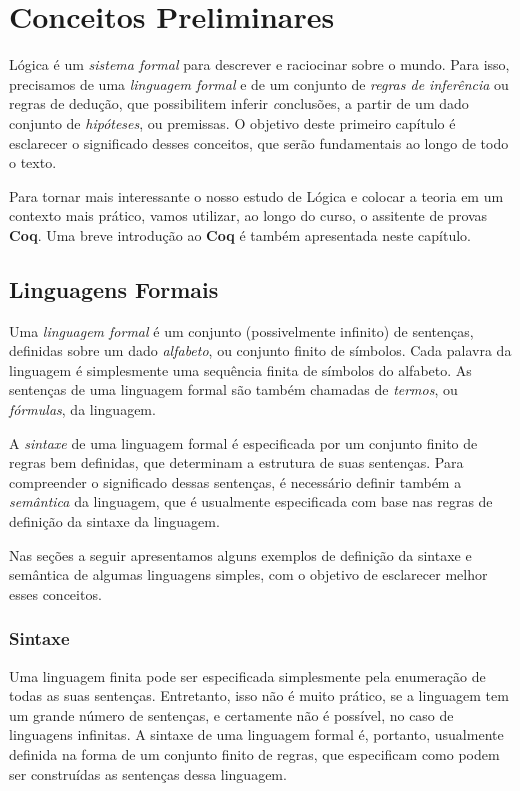 \chapter{Conceitos Preliminares}\label{cap1}

Lógica é um \emph{sistema formal\/} para descrever e raciocinar sobre o mundo. Para isso, precisamos de uma \emph{linguagem formal\/} e de um conjunto de \emph{regras de inferência\/} ou regras de dedução, que possibilitem inferir {\emph conclusões\/}, a partir de um dado conjunto de \emph{hipóteses\/}, ou premissas. O objetivo deste primeiro capítulo é esclarecer o significado desses conceitos, que serão fundamentais ao longo de todo o texto.

Para tornar mais interessante o nosso estudo de Lógica e colocar a teoria em um contexto mais prático, vamos utilizar, ao longo do curso, o assitente de provas \textbf{Coq}.  Uma breve introdução ao \textbf{Coq} é também apresentada neste capítulo.

\section{Linguagens Formais}

Uma \emph{linguagem formal\/} \'e um conjunto (possivelmente infinito) de sentenças, definidas sobre um dado \emph{alfabeto\/}, ou conjunto finito de símbolos. Cada palavra da linguagem é simplesmente uma sequência finita de símbolos do alfabeto. As sentenças de uma linguagem formal são também chamadas de \emph{termos\/}, ou \emph{fórmulas}, da linguagem.
  
A \emph{sintaxe\/} de uma linguagem formal é especificada por um conjunto finito de regras bem definidas, que determinam a estrutura de suas sentenças. Para compreender o significado dessas sentenças, é necessário definir também a \emph{semântica\/} da linguagem, que é usualmente especificada com base nas regras de definição da sintaxe da linguagem. 

Nas seções a seguir apresentamos alguns exemplos de definição da sintaxe e semântica de algumas linguagens simples, com o objetivo de esclarecer melhor esses conceitos. 

\subsection{Sintaxe}\label{cap1:syn}

Uma linguagem finita pode ser especificada simplesmente pela enumera\c{c}\~ao de todas as suas  sentenças. Entretanto, isso não é muito prático, se a linguagem tem um grande número de sentenças, e certamente não é possível, no caso de linguagens infinitas. A sintaxe de uma linguagem formal é, portanto, usualmente definida na forma de um conjunto finito de regras, que especificam como podem ser construídas as sentenças dessa linguagem.

